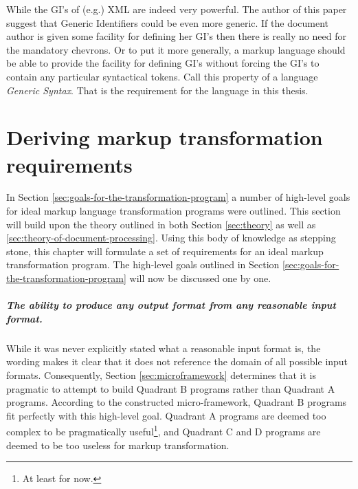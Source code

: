 \documentclass{scrreprt}
\begin{document}
While the GI's of (e.g.) XML are indeed very powerful. The author of this paper suggest that Generic Identifiers could be even more generic. If the document author is given some facility for defining her GI's then there is really no need for the mandatory chevrons. Or to put it more generally, a markup language should be able to provide the facility for defining GI's without forcing the GI's to contain any particular syntactical tokens. Call this property of a language \emph{Generic Syntax}. That is the requirement for the language in this thesis.





















%
%
%
%
%
%




\chapter{Deriving markup transformation requirements}
\label{chpt:derived-transformation-requirements}
In Section \ref{sec:goals-for-the-transformation-program} a number of high-level goals for ideal markup language transformation programs were outlined. This section will build upon the theory outlined in both Section \ref{sec:theory} as well as \ref{sec:theory-of-document-processing}. Using this body of knowledge as stepping stone, this chapter will formulate a set of requirements for an ideal markup transformation program. The high-level goals outlined in Section \ref{sec:goals-for-the-transformation-program} will now be discussed one by one.

\paragraph{The ability to produce any output format from any reasonable input format.} While it was never explicitly stated what a reasonable input format is, the wording makes it clear that it does not reference the domain of all possible input formats. Consequently, Section \ref{sec:microframework} determines that it is pragmatic to attempt to build Quadrant B programs rather than Quadrant A programs. According to the constructed micro-framework, Quadrant B programs fit perfectly with this high-level goal. Quadrant A programs are deemed too complex to be pragmatically useful\footnote{At least for now.}, and Quadrant C and D programs are deemed to be too useless for markup transformation.
\end{document}
